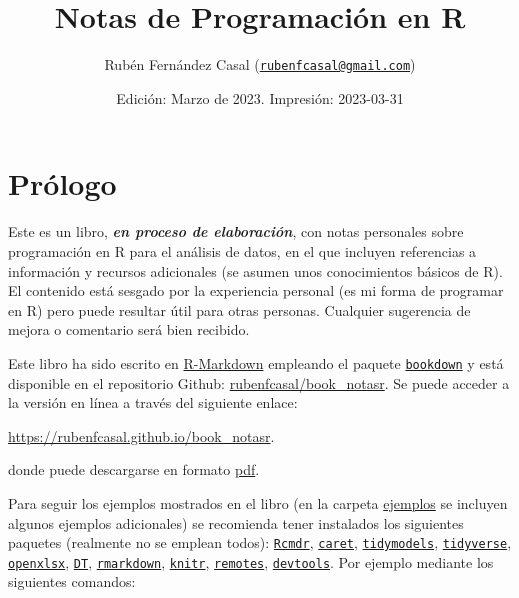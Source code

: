 \documentclass[
]{book}
\title{Notas de Programación en R}
\author{Rubén Fernández Casal (\href{mailto:rubenfcasal@gmail.com}{\nolinkurl{rubenfcasal@gmail.com}})}
\date{Edición: Marzo de 2023. Impresión: 2023-03-31}
\theoremstyle{break}
\theoremstyle{nonumberplain}
\begin{document}
\maketitle

{
\setcounter{tocdepth}{1}
\tableofcontents
}
\hypertarget{pruxf3logo}{%
\chapter*{Prólogo}\label{pruxf3logo}}

Este es un libro, \textbf{\emph{en proceso de elaboración}}, con notas personales sobre programación en R para el análisis de datos, en el que incluyen referencias a información y recursos adicionales (se asumen unos conocimientos básicos de R).
El contenido está sesgado por la experiencia personal (es mi forma de programar en R) pero puede resultar útil para otras personas.
Cualquier sugerencia de mejora o comentario será bien recibido.

Este libro ha sido escrito en \href{http://rmarkdown.rstudio.com}{R-Markdown} empleando el paquete \href{https://bookdown.org/yihui/bookdown/}{\texttt{bookdown}} y está disponible en el repositorio Github: \href{https://github.com/rubenfcasal/book_notasr}{rubenfcasal/book\_notasr}.
Se puede acceder a la versión en línea a través del siguiente enlace:

\url{https://rubenfcasal.github.io/book_notasr}.

donde puede descargarse en formato \href{https://rubenfcasal.github.io/book_notasr/Notas_R.pdf}{pdf}.

Para seguir los ejemplos mostrados en el libro (en la carpeta \href{https://github.com/rubenfcasal/book_notasr/tree/main/ejemplos}{ejemplos} se incluyen algunos ejemplos adicionales) se recomienda tener instalados los siguientes paquetes (realmente no se emplean todos):
\href{https://www.r-project.org}{\texttt{Rcmdr}}, \href{https://github.com/topepo/caret/}{\texttt{caret}}, \href{https://tidymodels.tidymodels.org}{\texttt{tidymodels}}, \href{https://tidyverse.tidyverse.org}{\texttt{tidyverse}}, \href{https://ycphs.github.io/openxlsx/index.html}{\texttt{openxlsx}}, \href{https://github.com/rstudio/DT}{\texttt{DT}}, \href{https://github.com/rstudio/rmarkdown}{\texttt{rmarkdown}}, \href{https://yihui.org/knitr/}{\texttt{knitr}}, \href{https://remotes.r-lib.org}{\texttt{remotes}}, \href{https://devtools.r-lib.org/}{\texttt{devtools}}.
Por ejemplo mediante los siguientes comandos:
\end{document}
